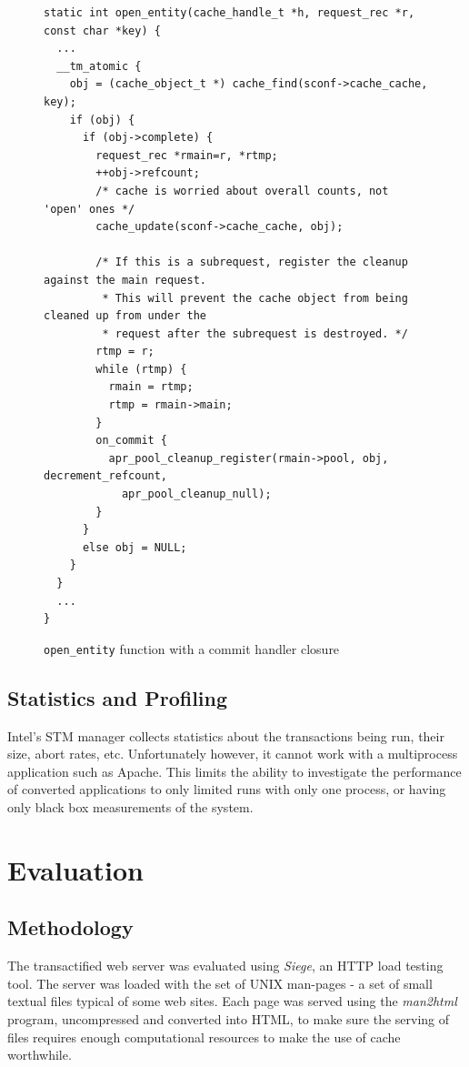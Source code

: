 \documentclass[preprint,natbib,11pt]{sigplanconf}
\begin{document}
\begin{figure}
\begin{lstlisting}
static int open_entity(cache_handle_t *h, request_rec *r, const char *key) {
  ...
  __tm_atomic {
    obj = (cache_object_t *) cache_find(sconf->cache_cache, key);
    if (obj) {
      if (obj->complete) {
        request_rec *rmain=r, *rtmp;
        ++obj->refcount;
        /* cache is worried about overall counts, not 'open' ones */
        cache_update(sconf->cache_cache, obj);

        /* If this is a subrequest, register the cleanup against the main request.
         * This will prevent the cache object from being cleaned up from under the
         * request after the subrequest is destroyed. */
        rtmp = r;
        while (rtmp) {
          rmain = rtmp;
          rtmp = rmain->main;
        }
        on_commit {
          apr_pool_cleanup_register(rmain->pool, obj, decrement_refcount, 
            apr_pool_cleanup_null);
        }
      }
      else obj = NULL;
    }
  }
  ...
}
\end{lstlisting}
\caption{{\tt open\_entity} function with a commit handler closure}
\label{code:closure-open-entity}
\end{figure}

\subsection{Statistics and Profiling}
Intel's STM manager collects statistics about the transactions being run, their
size, abort rates, etc. Unfortunately however, it cannot work with a
multiprocess application such as Apache. This limits the ability to investigate
the performance of converted applications to only limited runs with only one
process, or having only black box measurements of the system.

\section{Evaluation} 
\subsection{Methodology} 
The transactified web server was evaluated using \emph{Siege}\cite{siege}, an
HTTP load testing tool. The server was loaded with the set of UNIX man-pages - a
set of small textual files typical of some web sites. Each page was served using
the \emph{man2html}\cite{man2html} program, uncompressed and converted into
HTML, to make sure the serving of files requires enough computational resources
to make the use of cache worthwhile.
\end{document}
